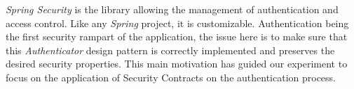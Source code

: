 \textit{Spring Security} is the library allowing the management of authentication and access control. Like any \textit{Spring} project, it is customizable. 
Authentication being the first security rampart of the application, the issue here is to make sure that this \textit{Authenticator} design pattern is correctly implemented and preserves the desired security properties.
This main motivation has guided our experiment to focus on the application of Security Contracts on the authentication process.

